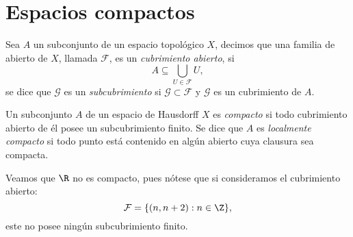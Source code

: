 \documentclass[11pt,oneside,a4paper]{book}
\begin{document}
\section{Espacios compactos}
\begin{mydef}
Sea $A$ un subconjunto de un espacio topológico $X$, decimos que una familia de abierto de $X$, llamada $\mathcal{F}$, es un \textit{cubrimiento abierto}, si
$$A\subseteq\bigcup_{U\in\mathcal{F}}U,$$
se dice que $\mathcal{G}$ es un \textit{subcubrimiento} si $\mathcal{G}\subset\mathcal{F}$ y $\mathcal{G}$ es un cubrimiento de $A$.
\end{mydef}
\begin{mydef}[Compacto]
Un subconjunto $A$ de un espacio de Hausdorff $X$ es \textit{compacto} si todo cubrimiento abierto de él posee un subcubrimiento finito. Se dice que $A$ es \textit{localmente compacto} si todo punto está contenido en algún abierto cuya clausura sea compacta.
\end{mydef}
Veamos que $\R$ no es compacto, pues nótese que si consideramos el cubrimiento abierto:
$$\mathcal{F}=\{(n,n+2):n\in\Z\},$$
este no posee ningún subcubrimiento finito.
\end{document}
